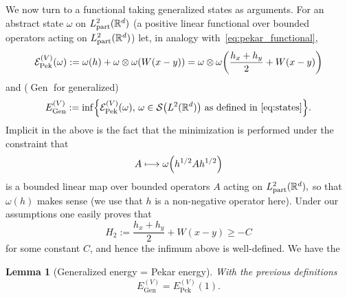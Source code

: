\documentclass[10pt]{amsart}
\newtheorem{lemm}[theo]{Lemma}\newtheorem{prop}[theo]{Proposition}\newtheorem{coro}[theo]{Corollary}\newtheorem{conj}[theo]{Conjecture}
\theoremstyle{definition}\newtheorem{defi}[theo]{Definition}\newtheorem{rema}[theo]{Remark}\newtheorem{exam}[theo]{Example}\newtheorem{exem}[theo]{Example}\newtheorem{nota}[theo]{Notation}
\DeclareMathOperator{\Pek}{Pek}
\DeclareMathOperator{\Genn}{Gen}
\newcommand{\cS}{\mathcal{S}}
\newcommand{\R}{\mathbb{R}}
\newcommand{\cE}{\mathcal{E}}
\newcommand{\1}{\mathds{1}}
\let\oldin\in
\renewcommand{\in}{\mathchoice{\oldin}{\oldin}{\,\oldin\,}{\,\oldin\,}}
\let\oldmapsto\mapsto
\renewcommand*{\mapsto}{\mathchoice{\longmapsto}{\oldmapsto}{\oldmapsto}{\oldmapsto}}
\let\originalleft\left
\let\originalright\right
\renewcommand{\left}{\mathopen{}\mathclose\bgroup\originalleft}
\renewcommand{\right}{\aftergroup\egroup\originalright}
\begin{document}
We now turn to a functional taking generalized states as arguments. For an abstract state $\omega$ on $L^2_{\rm part} (\R^d)$ (a positive linear functional over bounded operators acting on $L^2_{\rm part} (\R^d)$) let, in analogy with~\eqref{eq:pekar_functional},
\begin{equation*}
\cE_{\Pek}^{(V)}(\omega) := \omega (h) + \omega \otimes \omega \left(W(x-y)\right) = \omega \otimes \omega \left(\frac{h_x + h_y}{2} + W (x-y)\right)
\end{equation*}
and ($\Genn$ for generalized)
\begin{equation}\label{eq:gen ener}
E_{\Genn}^{(V)}:= \inf\left\lbrace \cE_{\Pek}^{(V)}(\omega), \, \omega \in \cS \left(L^2 (\R^d)\right) \text{ as defined in~\eqref{eq:states}}\right\rbrace.
\end{equation}
Implicit in the above is the fact that the minimization is performed under the constraint that
\[
A \mapsto \omega \left(h^{1/2} A h^{1/2} \right)
\]
is a bounded linear map over bounded operators $A$ acting on $L^2_{\rm part} (\R^d),$ so that $\omega (h)$ makes sense (we use that $h$ is a non-negative operator here). Under our assumptions one easily proves that
\begin{equation}\label{eq:two part op}
H_2:= \frac{h_x + h_y}{2} + W (x-y) \geq - C
\end{equation}
for some constant $C$, and hence the infimum above is well-defined. We have the

\begin{lemm}[{Generalized energy = Pekar energy}]\label{lem:gen ener}
With the previous definitions
\begin{equation*}
E_{\Genn}^{(V)} = E^{(V)}_{\Pek}(1).
\end{equation*}
\end{lemm}
\end{document}
